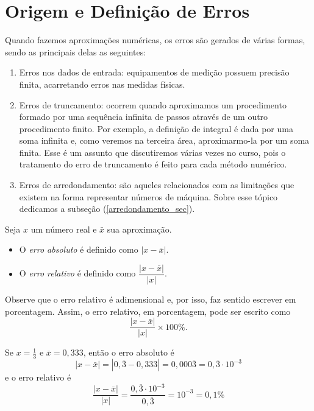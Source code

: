 \documentclass[main.tex]{subfiles}
\begin{document}
\section{Origem e Definição de Erros}
Quando fazemos aproximações numéricas, os erros são gerados de várias formas, sendo as principais delas as seguintes:
\begin{enumerate}
 \item Erros nos dados de entrada: equipamentos de medição possuem precisão finita, acarretando erros nas medidas físicas.
 \item Erros de truncamento: ocorrem quando aproximamos um procedimento formado por uma sequência infinita de passos através de um outro procedimento finito. Por exemplo, a definição de integral é dada por uma soma infinita e, como veremos na terceira área, aproximarmo-la por um soma finita. Esse é um assunto que discutiremos várias vezes no curso, pois o tratamento do erro de truncamento é feito para cada método numérico.
 \item Erros de arredondamento: são aqueles relacionados com as limitações que existem na forma representar números de máquina. Sobre esse tópico dedicamos a subseção (\ref{arredondamento_sec}).
\end{enumerate}

\begin{defn} Seja $x$ um número real e $\bar{x}$ sua aproximação.
 \begin{itemize}
  \item O \emph{erro absoluto} é definido como $|x-\bar{x}|$.
  \item O \emph{erro relativo} é definido como $\dfrac{|x-\bar{x}|}{|x|}$. 
 \end{itemize}
\end{defn}

\begin{obs}
  Observe que o erro relativo é adimensional e, por isso, faz sentido escrever em porcentagem. Assim, o erro relativo, em porcentagem, pode ser escrito como
  \begin{equation*}
    \frac{|x-\bar{x}|}{|x|}\times 100 \%.
  \end{equation*}
\end{obs}

\begin{ex}
Se $x=\frac{1}{3}$ e $\bar{x}=0,333$, então o erro absoluto é
$$
|x-\bar{x}|=|0,\overline{3}-0,333|=0,000\overline{3}=0,\overline{3}\cdot 10^{-3}
$$
e o erro relativo é
$$
\frac{|x-\bar{x}|}{|x|}=\frac{0,\overline{3}\cdot 10^{-3}}{0,\overline{3}}=10^{-3}=0,1\%
$$
\end{ex}
\end{document}
